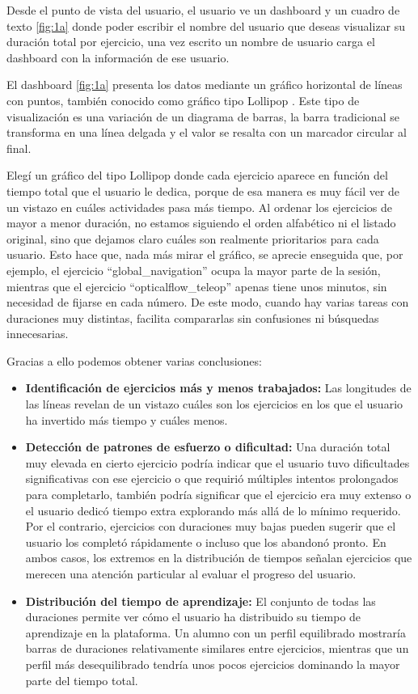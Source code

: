 \documentclass[a4paper, 12pt]{book}
\begin{document}
Desde el punto de vista del usuario, el usuario ve un dashboard y un cuadro de texto \ref{fig:1a} donde poder escribir el nombre del usuario que deseas visualizar su duración total por ejercicio, una vez escrito un nombre de usuario carga el dashboard con la información de ese usuario.

El dashboard \ref{fig:1a} presenta los datos mediante un gráfico horizontal de líneas con puntos, también conocido como gráfico tipo Lollipop . Este tipo de visualización es una variación de un diagrama de barras, la barra tradicional se transforma en una línea delgada y el valor se resalta con un marcador circular al final.

Elegí un gráfico del tipo Lollipop donde cada ejercicio aparece en función del tiempo total que el usuario le dedica, porque de esa manera es muy fácil ver de un vistazo en cuáles actividades pasa más tiempo. Al ordenar los ejercicios de mayor a menor duración, no estamos siguiendo el orden alfabético ni el listado original, sino que dejamos claro cuáles son realmente prioritarios para cada usuario. Esto hace que, nada más mirar el gráfico, se aprecie enseguida que, por ejemplo, el ejercicio “global\_navigation” ocupa la mayor parte de la sesión, mientras que el ejercicio “opticalflow\_teleop” apenas tiene unos minutos, sin necesidad de fijarse en cada número. De este modo, cuando hay varias tareas con duraciones muy distintas, facilita compararlas sin confusiones ni búsquedas innecesarias.

Gracias a ello podemos obtener varias conclusiones:

\begin{itemize}
  \item \textbf{Identificación de ejercicios más y menos trabajados:} Las longitudes de las líneas revelan de un vistazo cuáles son los ejercicios en los que el usuario ha invertido más tiempo y cuáles menos.

  \item \textbf{Detección de patrones de esfuerzo o dificultad:} Una duración total muy elevada en cierto ejercicio podría indicar que el usuario tuvo dificultades significativas con ese ejercicio o que requirió múltiples intentos prolongados para completarlo, también podría significar que el ejercicio era muy extenso o el usuario dedicó tiempo extra explorando más allá de lo mínimo requerido. Por el contrario, ejercicios con duraciones muy bajas pueden sugerir que el usuario los completó rápidamente o incluso que los abandonó pronto. En ambos casos, los extremos en la distribución de tiempos señalan ejercicios que merecen una atención particular al evaluar el progreso del usuario.

  \item \textbf{Distribución del tiempo de aprendizaje:} El conjunto de todas las duraciones permite ver cómo el usuario ha distribuido su tiempo de aprendizaje en la plataforma. Un alumno con un perfil equilibrado mostraría barras de duraciones relativamente similares entre ejercicios, mientras que un perfil más desequilibrado tendría unos pocos ejercicios dominando la mayor parte del tiempo total.
\end{itemize}
\end{document}
